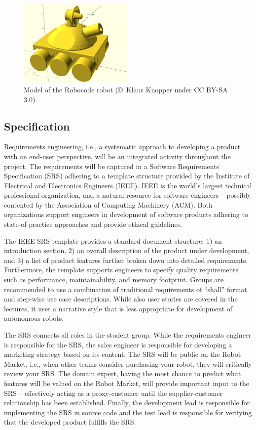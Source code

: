 \documentclass{scrreprt}
\begin{document}
\begin{figure}
\centering
\includegraphics[width=0.50\textwidth]{figures/robotSide.jpg}
\caption{Model of the Robocode robot (\copyright~Klaus Knopper under CC BY-SA 3.0).}
\label{fig:robot}
\end{figure}

\subsection{Specification}
Requirements engineering, i.e., a systematic approach to developing a product with an end-user perspective, will be an integrated activity throughout the project. The requirements will be captured in a Software Requirements Specification (SRS) adhering to a template structure provided by the Institute of Electrical and Electronics Engineers (IEEE). IEEE is the world's largest technical professional organization, and a natural resource for software engineers -- possibly contented by the Association of Computing Machinery (ACM). Both organizations support engineers in development of software products adhering to state-of-practice approaches and provide ethical guidelines.

The IEEE SRS template provides a standard document structure: 1) an introduction section, 2) an overall description of the product under development, and 3) a list of product features further broken down into detailed requirements. Furthermore, the template supports engineers to specify quality requirements such as performance, maintainability, and memory footprint. Groups are recommended to use a combination of traditional requirements of ``shall'' format and step-wise use case descriptions. While also user stories are covered in the lectures, it uses a narrative style that is less appropriate for development of autonomous robots.

The SRS connects all roles in the student group. While the requirements engineer is responsible for the SRS, the sales engineer is responsible for developing a marketing strategy based on its content. The SRS will be public on the Robot Market, i.e., when other teams consider purchasing your robot, they will critically review your SRS. The domain expert, having the most chance to predict what features will be valued on the Robot Market, will provide important input to the SRS -- effectively acting as a proxy-customer until the supplier-customer relationship has been established. Finally, the development lead is responsible for implementing the SRS in source code and the test lead is responsible for verifying that the developed product fulfills the SRS.
\end{document}
